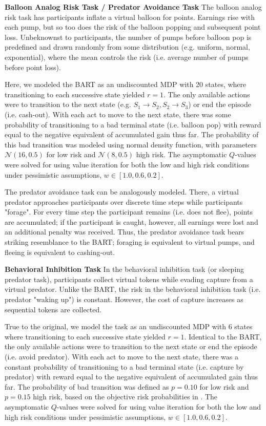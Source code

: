 \documentclass[11pt]{article} %
\begin{document}
\textbf{Balloon Analog Risk Task / Predator Avoidance Task} The balloon analog risk task \citep{Lejuez2002} has participants inflate a virtual balloon for points. Earnings rise with each pump, but so too does the risk of the balloon popping and subsequent point loss. Unbeknownst to participants, the number of pumps before balloon pop is predefined and drawn randomly from some distribution (e.g. uniform, normal, exponential), where the mean controls the risk (i.e. average number of pumps before point loss). 

Here, we modeled the BART as an undiscounted MDP with 20 states, where transitioning to each successive state yielded $r=1$. The only available actions were to transition to the next state (e.g. $S_1 \rightarrow S_2, S_2 \rightarrow S_3$) or end the episode (i.e. cash-out). With each act to move to the next state, there was some probability of transitioning to a bad terminal state (i.e. balloon pop) with reward equal to the negative equivalent of accumulated gain thus far. The probability of this bad transition was modeled using normal density function, with parameters $\mathcal{N}(16,0.5)$ for low risk and $\mathcal{N}(8,0.5)$ high risk. The asymptomatic $Q$-values were solved for using value iteration for both the low and high risk conditions under pessimistic assumptions, $w \in [1.0, 0.6, 0.2]$.

The predator avoidance task \citep{fung2019} can be analogously modeled. There, a virtual predator approaches participants over discrete time steps while participants "forage". For every time step the participant remains (i.e. does not flee), points are accumulated; if the participant is caught, however, all earnings were lost and an additional penalty was received. Thus, the predator avoidance task bears striking resemblance to the BART; foraging is equivalent to virtual pumps, and fleeing is equivalent to cashing-out.  

\textbf{Behavioral Inhibition Task} In the behavioral inhibition task \citep{bach2015} (or sleeping predator task), participants collect virtual tokens while evading capture from a virtual predator. Unlike the BART, the risk in the behavioral inhibition task (i.e. predator "waking up") is constant. However, the cost of capture increases as sequential tokens are collected.

True to the original, we model the task as an undiscounted MDP with 6 states where transitioning to each successive state yielded $r=1$. Identical to the BART, the only available actions were to transition to the next state or end the episode (i.e. avoid predator). With each act to move to the next state, there was a constant probability of transitioning to a bad terminal state (i.e. capture by predator) with reward equal to the negative equivalent of accumulated gain thus far. The probability of bad transition was defined as $p = 0.10$ for low risk and $p = 0.15$ high risk, based on the objective risk probabilities in \citep{bach2015}. The asymptomatic $Q$-values were solved for using value iteration for both the low and high risk conditions under pessimistic assumptions, $w \in [1.0, 0.6, 0.2]$.
\end{document}

